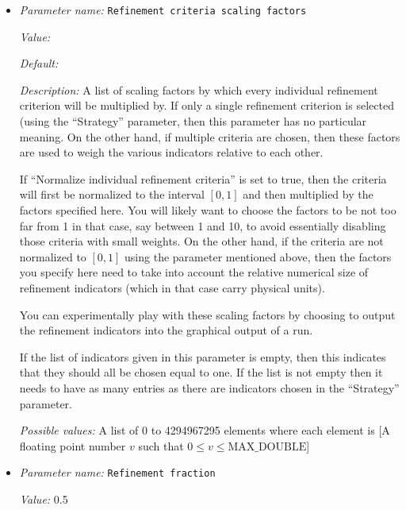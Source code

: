 \begin{itemize}
{\it Possible values:} Any one of plus, max
\item {\it Parameter name:} {\tt Refinement criteria scaling factors}
\label{parameters:Mesh refinement/Refinement criteria scaling factors}
\label{parameters:Mesh_20refinement/Refinement_20criteria_20scaling_20factors}


{\it Value:} 


{\it Default:} 


{\it Description:} A list of scaling factors by which every individual refinement criterion will be multiplied by. If only a single refinement criterion is selected (using the ``Strategy'' parameter, then this parameter has no particular meaning. On the other hand, if multiple criteria are chosen, then these factors are used to weigh the various indicators relative to each other. 

If ``Normalize individual refinement criteria'' is set to true, then the criteria will first be normalized to the interval $[0,1]$ and then multiplied by the factors specified here. You will likely want to choose the factors to be not too far from 1 in that case, say between 1 and 10, to avoid essentially disabling those criteria with small weights. On the other hand, if the criteria are not normalized to $[0,1]$ using the parameter mentioned above, then the factors you specify here need to take into account the relative numerical size of refinement indicators (which in that case carry physical units).

You can experimentally play with these scaling factors by choosing to output the refinement indicators into the graphical output of a run.

If the list of indicators given in this parameter is empty, then this indicates that they should all be chosen equal to one. If the list is not empty then it needs to have as many entries as there are indicators chosen in the ``Strategy'' parameter.


{\it Possible values:} A list of 0 to 4294967295 elements where each element is [A floating point number $v$ such that $0 \leq v \leq \text{MAX\_DOUBLE}$]
\item {\it Parameter name:} {\tt Refinement fraction}
\label{parameters:Mesh refinement/Refinement fraction}
\label{parameters:Mesh_20refinement/Refinement_20fraction}


{\it Value:} 0.5



\end{itemize}
